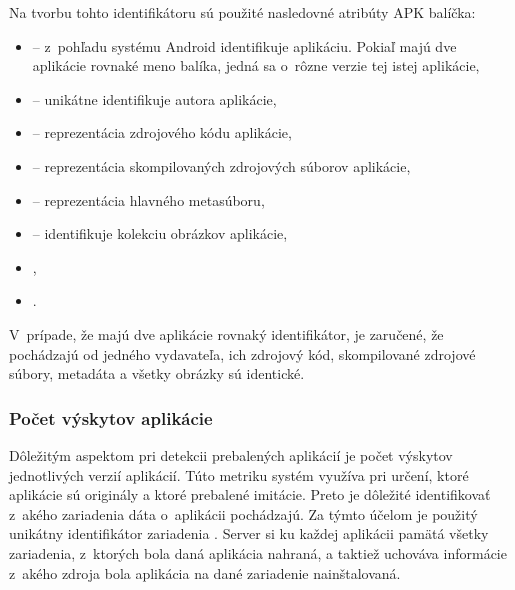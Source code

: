\noindent Na tvorbu tohto identifikátoru sú použité nasledovné atribúty APK balíčka: 
\begin{itemize}
	\item {} -- z~pohľadu systému Android identifikuje aplikáciu. Pokiaľ majú dve aplikácie rovnaké meno balíka, jedná sa o~rôzne verzie tej istej aplikácie,
	\item {} -- unikátne identifikuje autora aplikácie,
	\item {} -- reprezentácia zdrojového kódu aplikácie,
	\item {} -- reprezentácia skompilovaných zdrojových súborov aplikácie,
	\item {} -- reprezentácia hlavného metasúboru,
	\item {} -- identifikuje kolekciu obrázkov aplikácie,
	\item {},
	\item {}.
\end{itemize}
V~prípade, že majú dve aplikácie rovnaký identifikátor, je zaručené, že pochádzajú od jedného vydavateľa, ich zdrojový kód, skompilované zdrojové súbory, metadáta a všetky  obrázky sú identické. 

\subsubsection{\textbf{Počet výskytov aplikácie}}
Dôležitým aspektom pri detekcii prebalených aplikácií je počet výskytov jednotlivých verzií aplikácií. Túto metriku systém využíva pri určení, ktoré aplikácie sú originály a ktoré prebalené imitácie. Preto je dôležité identifikovať z~akého zariadenia dáta o~aplikácii pochádzajú. Za týmto účelom je použitý unikátny identifikátor zariadenia . Server si ku každej aplikácii pamätá všetky zariadenia, z~ktorých bola daná aplikácia nahraná, a taktiež uchováva informácie z~akého zdroja bola aplikácia na dané zariadenie nainštalovaná.


